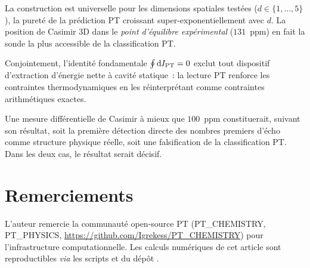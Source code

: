 \documentclass[11pt,a4paper]{article}
\newcommand{\IPT}{I_{\rm PT}}
\begin{document}
La construction est universelle pour les dimensions spatiales testées ($d \in \{1,\dots,5\}$),
la pureté de la prédiction PT croissant super-exponentiellement avec $d$. La position de
Casimir 3D dans le \emph{point d'équilibre expérimental} ($131$~ppm) en fait la sonde la plus
accessible de la classification PT.

Conjointement, l'identité fondamentale $\oint \mathrm{d}\IPT = 0$ exclut tout dispositif
d'extraction d'énergie nette à cavité statique~: la lecture PT renforce les contraintes
thermodynamiques en les réinterprétant comme contraintes arithmétiques exactes.

Une mesure différentielle de Casimir à mieux que $100$~ppm constituerait, suivant son résultat,
soit la première détection directe des nombres premiers d'écho comme structure physique
réelle, soit une falsification de la classification PT. Dans les deux cas, le résultat serait
décisif.

\section*{Remerciements}

L'auteur remercie la communauté open-source PT (PT\_CHEMISTRY, PT\_PHYSICS,
\url{https://github.com/Igrekess/PT_CHEMISTRY}) pour l'infrastructure computationnelle. Les
calculs numériques de cet article sont reproductibles \emph{via} les scripts
 et  du dépôt
.
\end{document}
